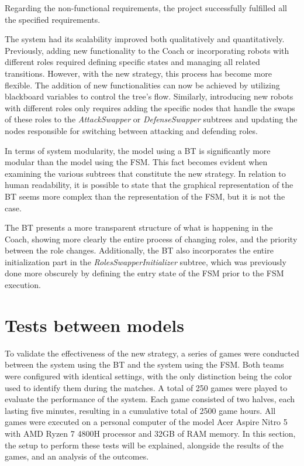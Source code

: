 Regarding the non-functional requirements, the project successfully fulfilled all the specified requirements.

The system had its scalability improved both qualitatively and quantitatively. Previously, adding new functionality to the Coach or incorporating robots with different roles required defining specific states and managing all related transitions. However, with the new strategy, this process has become more flexible. The addition of new functionalities can now be achieved by utilizing blackboard variables to control the tree's flow. Similarly, introducing new robots with different roles only requires adding the specific nodes that handle the swaps of these roles to the \textit{AttackSwapper} or \textit{DefenseSwapper} subtrees and updating the nodes responsible for switching between attacking and defending roles.

In terms of system modularity, the model using a BT is significantly more modular than the model using the FSM. This fact becomes evident when examining the various subtrees that constitute the new strategy. In relation to human readability, it is possible to state that the graphical representation of the BT seems more complex than the representation of the FSM, but it is not the case.

The BT presents a more transparent structure of what is happening in the Coach, showing more clearly the entire process of changing roles, and the priority between the role changes. Additionally, the BT also incorporates the entire initialization part in the \textit{RolesSwapperInitializer} subtree, which was previously done more obscurely by defining the entry state of the FSM prior to the FSM execution.

\section{Tests between models}

To validate the effectiveness of the new strategy, a series of games were conducted between the system using the BT and the system using the FSM. Both teams were configured with identical settings, with the only distinction being the color used to identify them during the matches. A total of 250 games were played to evaluate the performance of the system. Each game consisted of two halves, each lasting five minutes, resulting in a cumulative total of 2500 game hours. All games were executed on a personal computer of the model Acer Aspire Nitro 5 with AMD Ryzen 7 4800H processor and 32GB of RAM memory. In this section, the setup to perform these tests will be explained, alongside the results of the games, and an analysis of the outcomes.

